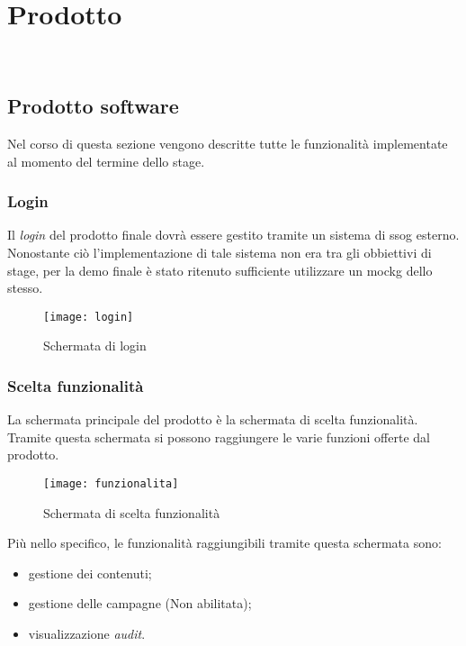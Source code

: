 
\chapter{Prodotto}
\label{cap:prodotto}

\\

\section{Prodotto software}
Nel corso di questa sezione vengono descritte tutte le funzionalità implementate al momento del termine dello stage.

\subsection{Login}
Il \textit{login} del prodotto finale dovrà essere gestito tramite un sistema di \gls{ssog} esterno. Nonostante ciò l'implementazione di tale sistema non era tra gli obbiettivi di stage, per la demo finale è stato ritenuto sufficiente utilizzare un \gls{mockg} dello stesso. 
\begin{figure}[h]
    \begin{center}
    \texttt{[image: login]}
    \caption{Schermata di login}
    \label{fig:figure20}
    \end{center}
\end{figure}

\subsection{Scelta funzionalità}
La schermata principale del prodotto è la schermata di scelta funzionalità. Tramite questa schermata si possono raggiungere le varie funzioni offerte dal prodotto.
\begin{figure}[h]
    \begin{center}
    \texttt{[image: funzionalita]}
    \caption{Schermata di scelta funzionalità}
    \label{fig:figure21}
    \end{center}
\end{figure}
Più nello specifico, le funzionalità raggiungibili tramite questa schermata sono:
\begin{itemize}
    \item gestione dei contenuti;
    \item gestione delle campagne (Non abilitata);
    \item visualizzazione \textit{audit}.
\end{itemize}

